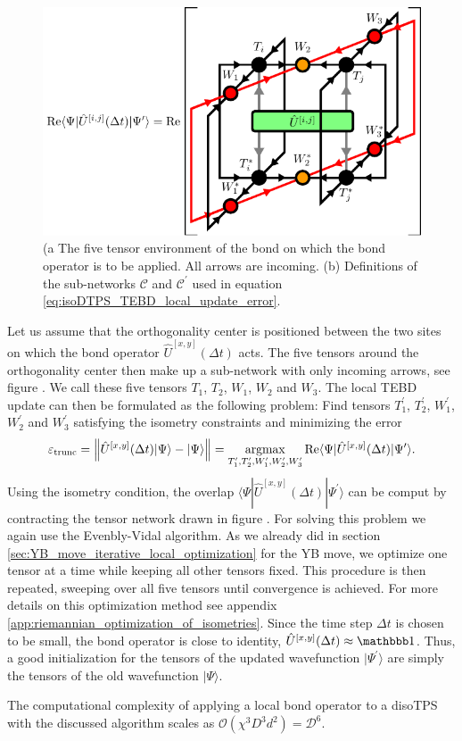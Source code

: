 \begin{figure}
	\centering
	\includegraphics[scale=1]{figures/tikz/disoTPS/tebd_environment/tebd_environment.pdf}
	\caption{(a The five tensor environment of the bond on which the bond operator is to be applied. All arrows are incoming. (b) Definitions of the sub-networks $\mathcal{C}$ and $\mathcal{C}^\prime$ used in equation \eqref{eq:isoDTPS_TEBD_local_update_error}.}
	\label{fig:disoTPS_TEBD_definition_of_environment}
\end{figure}
Let us assume that the orthogonality center is positioned between the two sites on which the bond operator $\hat{U}^{[x, y]}\left(\Delta t\right)$ acts. The five tensors around the orthogonality center then make up a sub-network with only incoming arrows, see figure . We call these five tensors $T_1$, $T_2$, $W_1$, $W_2$ and $W_3$. The local TEBD update can then be formulated as the following problem: Find tensors $T_1^\prime$, $T_2^\prime$, $W_1^\prime$, $W_2^\prime$ and $W_3^\prime$ satisfying the isometry constraints and minimizing the error
\begin{equation}
	\label{eq:isoDTPS_TEBD_local_update_error}
	\varepsilon_\text{trunc} = \left\lVert \hat{U}^{[x,y]}(\Delta t)|\Psi\rangle - |\Psi\rangle\right\rVert = \underset{T_1^\prime, T_2^\prime, W_1^\prime, W_2^\prime, W_3^\prime}{\operatorname{argmax}}\operatorname{Re}\langle\Psi|\hat{U}^{[x,y]}(\Delta t)|\Psi^\prime\rangle.
\end{equation}
Using the isometry condition, the overlap $\langle\Psi|\hat{U}^{[x,y]}(\Delta t)|\Psi^\prime\rangle$ can be comput by contracting the tensor network drawn in figure . For solving this problem we again use the Evenbly-Vidal algorithm. As we already did in section \ref{sec:YB_move_iterative_local_optimization} for the YB move, we optimize one tensor at a time while keeping all other tensors fixed. This procedure is then repeated, sweeping over all five tensors until convergence is achieved. For more details on this optimization method see appendix \ref{app:riemannian_optimization_of_isometries}. Since the time step $\Delta t$ is chosen to be small, the bond operator is close to identity, $\hat{U}^{[x,y]}(\Delta t)\approx\id$. Thus, a good initialization for the tensors of the updated wavefunction $|\Psi^\prime\rangle$ are simply the tensors of the old wavefunction $|\Psi\rangle$. \par
The computational complexity of applying a local bond operator to a disoTPS with the discussed algorithm scales as $\mathcal{O}(\chi^3D^3d^2) = \mathcal{D^6}$. 